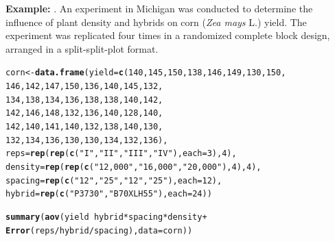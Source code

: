 \documentclass[12pt,english]{article}\usepackage[]{graphicx}\usepackage[table]{xcolor}
\makeatletter
\newcommand{\hlnum}[1]{\textcolor[rgb]{0.686,0.059,0.569}{#1}}%
\newcommand{\hlsng}[1]{\textcolor[rgb]{0.192,0.494,0.8}{#1}}%
\newcommand{\hlopt}[1]{\textcolor[rgb]{0,0,0}{#1}}%
\newcommand{\hldef}[1]{\textcolor[rgb]{0.345,0.345,0.345}{#1}}%
\newcommand{\hlkwb}[1]{\textcolor[rgb]{0.69,0.353,0.396}{#1}}%
\newcommand{\hlkwc}[1]{\textcolor[rgb]{0.333,0.667,0.333}{#1}}%
\newcommand{\hlkwd}[1]{\textcolor[rgb]{0.737,0.353,0.396}{\textbf{#1}}}%
\newenvironment{kframe}{%
 \def\at@end@of@kframe{}%
 \ifinner\ifhmode%
  \def\at@end@of@kframe{\end{minipage}}%
  \begin{minipage}{\columnwidth}%
 \fi\fi%
 \def\FrameCommand##1{\hskip\@totalleftmargin \hskip-\fboxsep
 \colorbox{shadecolor}{##1}\hskip-\fboxsep
     \hskip-\linewidth \hskip-\@totalleftmargin \hskip\columnwidth}%
 \MakeFramed {\advance\hsize-\width
   \@totalleftmargin\z@ \linewidth\hsize
   \@setminipage}}%
 {\par\unskip\endMakeFramed%
 \at@end@of@kframe}
\newenvironment{knitrout}{}{} %
\makeatother
\begin{document}
\begin{tcolorbox}[colback=yellow!50!red!25!white,colbacktitle=yellow!50!red,colframe=black!75!white,title=\textbf{R:} Split-Split-Plot]
\textbf{Example:} \citep{hoshmand}. An experiment in Michigan was conducted to determine the influence of plant density and hybrids on corn (\textit{Zea mays} L.) yield.  The experiment was replicated four times in a randomized complete block design, arranged in a split-split-plot format.
\begin{knitrout}
\color{fgcolor}\begin{kframe}
\begin{alltt}
\hldef{corn} \hlkwb{<-} \hlkwd{data.frame}\hldef{(}\hlkwc{yield}\hldef{=}  \hlkwd{c}\hldef{(}\hlnum{140}\hldef{,}\hlnum{145}\hldef{,}\hlnum{150}\hldef{,}\hlnum{138}\hldef{,}\hlnum{146}\hldef{,}\hlnum{149}\hldef{,}\hlnum{130}\hldef{,}\hlnum{150}\hldef{,}
                             \hlnum{146}\hldef{,}\hlnum{142}\hldef{,}\hlnum{147}\hldef{,}\hlnum{150}\hldef{,}\hlnum{136}\hldef{,}\hlnum{140}\hldef{,}\hlnum{145}\hldef{,}\hlnum{132}\hldef{,}
                             \hlnum{134}\hldef{,}\hlnum{138}\hldef{,}\hlnum{134}\hldef{,}\hlnum{136}\hldef{,}\hlnum{138}\hldef{,}\hlnum{138}\hldef{,}\hlnum{140}\hldef{,}\hlnum{142}\hldef{,}
                             \hlnum{142}\hldef{,}\hlnum{146}\hldef{,}\hlnum{148}\hldef{,}\hlnum{132}\hldef{,}\hlnum{136}\hldef{,}\hlnum{140}\hldef{,}\hlnum{128}\hldef{,}\hlnum{140}\hldef{,}
                             \hlnum{142}\hldef{,}\hlnum{140}\hldef{,}\hlnum{141}\hldef{,}\hlnum{140}\hldef{,}\hlnum{132}\hldef{,}\hlnum{138}\hldef{,}\hlnum{140}\hldef{,}\hlnum{130}\hldef{,}
                             \hlnum{132}\hldef{,}\hlnum{134}\hldef{,}\hlnum{136}\hldef{,}\hlnum{130}\hldef{,}\hlnum{130}\hldef{,}\hlnum{134}\hldef{,}\hlnum{132}\hldef{,}\hlnum{136}\hldef{),}
        \hlkwc{reps} \hldef{=} \hlkwd{rep}\hldef{(}\hlkwd{rep}\hldef{(}\hlkwd{c}\hldef{(}\hlsng{"I"}\hldef{,}\hlsng{"II"}\hldef{,}\hlsng{"III"}\hldef{,}\hlsng{"IV"}\hldef{),} \hlkwc{each} \hldef{=} \hlnum{3}\hldef{),}\hlnum{4}\hldef{),}
        \hlkwc{density} \hldef{=} \hlkwd{rep}\hldef{(}\hlkwd{rep}\hldef{(}\hlkwd{c}\hldef{(}\hlsng{"12,000"}\hldef{,}\hlsng{"16,000"}\hldef{,} \hlsng{"20,000"}\hldef{),}\hlnum{4}\hldef{),}\hlnum{4}\hldef{),}
        \hlkwc{spacing} \hldef{=} \hlkwd{rep}\hldef{(}\hlkwd{c}\hldef{(}\hlsng{"12"}\hldef{,}\hlsng{"25"}\hldef{,}\hlsng{"12"}\hldef{,} \hlsng{"25"}\hldef{),} \hlkwc{each} \hldef{=} \hlnum{12}\hldef{),}
        \hlkwc{hybrid} \hldef{=} \hlkwd{rep}\hldef{(}\hlkwd{c}\hldef{(}\hlsng{"P3730"}\hldef{,} \hlsng{"B70XLH55"}\hldef{),} \hlkwc{each} \hldef{=} \hlnum{24}\hldef{))}

\hlkwd{summary}\hldef{(}\hlkwd{aov}\hldef{(yield} \hlopt{~} \hldef{hybrid} \hlopt{*} \hldef{spacing} \hlopt{*} \hldef{density} \hlopt{+}
              \hlkwd{Error}\hldef{(reps}\hlopt{/}\hldef{hybrid}\hlopt{/}\hldef{spacing),} \hlkwc{data} \hldef{= corn))}
\end{alltt}
\end{kframe}
\end{knitrout}
\end{tcolorbox}
\end{document}
